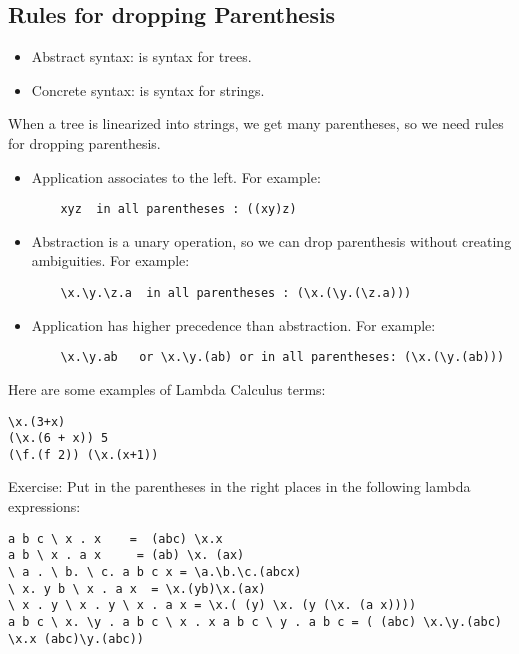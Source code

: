 \documentclass{article}
\begin{document}
 \subsection{Rules for dropping Parenthesis}                            
\begin{itemize}
  \item Abstract syntax: is syntax for trees.
  \item Concrete syntax: is syntax for strings.
\end{itemize}
When a tree is linearized into strings, we get many parentheses, so we need rules for dropping parenthesis.
\begin{itemize}
  \item Application associates to the left.
  \newline For example:
  \begin{lstlisting}
    xyz  in all parentheses : ((xy)z)
  \end{lstlisting} 
  \item Abstraction is a unary operation, so we can drop parenthesis without creating ambiguities.
    \newline For example:
    \begin{lstlisting}
    \x.\y.\z.a  in all parentheses : (\x.(\y.(\z.a)))
 \end{lstlisting} 
 \item Application has higher precedence than abstraction.
    \newline For example:
    \begin{lstlisting}
    \x.\y.ab   or \x.\y.(ab) or in all parentheses: (\x.(\y.(ab)))
 \end{lstlisting} 
\end{itemize}
Here are some examples of Lambda Calculus terms:
\begin{lstlisting}
\x.(3+x)  
(\x.(6 + x)) 5 
(\f.(f 2)) (\x.(x+1))
 \end{lstlisting} 
Exercise: Put in the parentheses in the right places in the following lambda expressions:
\begin{lstlisting}
a b c \ x . x    =  (abc) \x.x
a b \ x . a x     = (ab) \x. (ax)
\ a . \ b. \ c. a b c x = \a.\b.\c.(abcx)
\ x. y b \ x . a x  = \x.(yb)\x.(ax)
\ x . y \ x . y \ x . a x = \x.( (y) \x. (y (\x. (a x))))
a b c \ x. \y . a b c \ x . x a b c \ y . a b c = ( (abc) \x.\y.(abc) \x.x (abc)\y.(abc))
 \end{lstlisting} 
\end{document}
